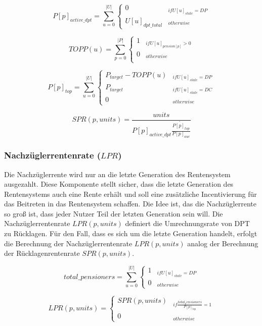 \begin{equation}
P[p]_{active\_dpt} = \sum_{u=0}^{|U|} \begin{cases} 
0 & _{if U[u]_{state} = DP}\\
U[u]_{dpt\_total} & _{otherwise}
\end{cases}
\end{equation}

\begin{equation*}
TOPP(u) = \sum_{p=0}^{|P|} \begin{cases}
1 & _{if U[u]_{pension[p]} > 0}\\
0 & _{otherwise}\\
\end{cases}
\end{equation*}



\begin{equation}
P[p]_{top} = \sum_{u=0}^{|U|} \begin{cases} 
P_{target} - TOPP(u)  & _{if U[u]_{state} = DP}\\
P_{target} & _{if U[u]_{state} = DC}\\
0 & _{otherwise}
\end{cases}
\end{equation}

\begin{equation}
SPR(p, units) = \frac{units} {P[p]_{active\_dpt} \dot {\frac{P[p]_{top}} {P[p]_{auc}}}
}
\end{equation}


\subsubsection*{Nachzüglerrentenrate ($LPR$)}

Die Nachzüglerrente wird nur an die letzte Generation des 
Rentensystem ausgezahlt. Diese Komponente stellt sicher, dass die letzte
Generation des Rentensystems auch eine Rente erhält und soll eine zusätzliche Incentivierung für das Beitreten in das Rentensystem schaffen. Die Idee ist, das die Nachzüglerrente so groß ist, dass jeder Nutzer Teil der letzten Generation sein will. 
Die Nachzüglerrentenrate $LPR(p, units)$ definiert die Umrechnungsrate von DPT zu Rücklagen. Für den Fall, dass es sich um die letzte Generation handelt, erfolgt die Berechnung der Nachzüglerrentenrate $LPR(p, units)$ analog der Berechnung der Rücklagenrentenrate $SPR(p, units)$.

\begin{equation}
total\_pensioners =  \sum_{u=0}^{|U|} \begin{cases} 
1  & _{if U[u]_{state} = DP}\\
0 & _{otherwise}
\end{cases}
\end{equation}

\begin{equation}
LPR(p, units) =  \begin{cases} 
SPR(p, units)  & _{if \frac{total_pensioners} {P[p]_{top}} = 1}\\
0 & _{otherwise}
\end{cases}
\end{equation}$  $